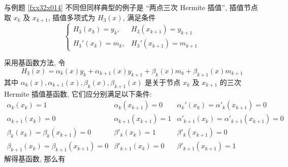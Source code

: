 
与例题 \ref{fxx32x014} 不同但同样典型的例子是 “两点三次 Hermite 插值”, 插值节点取 $x_k$ 及 $x_{k+1}$, 插值多项式为 $H_3(x)$, 满足条件
$$\begin{cases}
        H_3(x_k)=y_k,  & H_3(x_{k+1})=y_{k+1}  \\
        H_3'(x_k)=m_k, & H_3'(x_{k+1})=m_{k+1}
    \end{cases}$$

\begin{theorem}
    \label{twoPointTripleHermiteInterpolation}
    采用基函数方法, 令 $$H_3(x)=\alpha_k(x)y_k+\alpha_{k+1}(x)y_{k+1}+\beta_k(x)m_k+\beta_{k+1}(x)m_{k+1}$$
    其中 $\alpha_k(x),\alpha_{k+1}(x),\beta_k(x),\beta_{k+1}(x)$ 是关于节点 $x_k$ 及 $x_{k+1}$ 的三次 Hermite 插值基函数, 它们应分别满足以下条件:
    $$\begin{array}{lll}
            \alpha _k(x_k)=1                        & \alpha _k(x_{k+1})=0     & \alpha _k'(x_k)=\alpha '_k(x_{k+1})=0         \\
            \alpha _{k+1}(x_k)=0                    & \alpha _{k+1}(x_{k+1})=1 & \alpha' _{k+1}(x_k)=\alpha '_{k+1}(x_{k+1})=0 \\
            \beta_k(x_k)=\beta_k(x_{k+1})=0         & \beta'_k(x_k)=1          & \beta'_k(x_{k+1})=0                           \\
            \beta_{k+1}(x_k)=\beta_{k+1}(x_{k+1})=0 & \beta'_{k+1}(x_k)=0      & \beta'_{k+1}(x_{k+1})=1
        \end{array}$$
    解得基函数, 那么有
\end{theorem}


